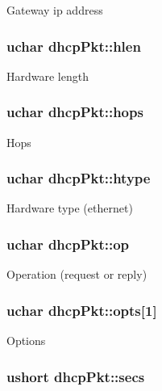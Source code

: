 Gateway ip address \hypertarget{structdhcpPkt_a08914a4ec7eb2b42b49c58846241c651}{
\subsubsection[{hlen}]{\setlength{\rightskip}{0pt plus 5cm}uchar dhcp\-Pkt\-::hlen}}\label{structdhcpPkt_a08914a4ec7eb2b42b49c58846241c651}
Hardware length \hypertarget{structdhcpPkt_ab23d57fb3a3cd50f1a98a74640be536f}{
\subsubsection[{hops}]{\setlength{\rightskip}{0pt plus 5cm}uchar dhcp\-Pkt\-::hops}}\label{structdhcpPkt_ab23d57fb3a3cd50f1a98a74640be536f}
Hops \hypertarget{structdhcpPkt_ac24a7e3d31318851bc5d84e675148d08}{
\subsubsection[{htype}]{\setlength{\rightskip}{0pt plus 5cm}uchar dhcp\-Pkt\-::htype}}\label{structdhcpPkt_ac24a7e3d31318851bc5d84e675148d08}
Hardware type (ethernet) \hypertarget{structdhcpPkt_a6240894b73b2216f6390e867274dfc9c}{
\subsubsection[{op}]{\setlength{\rightskip}{0pt plus 5cm}uchar dhcp\-Pkt\-::op}}\label{structdhcpPkt_a6240894b73b2216f6390e867274dfc9c}
Operation (request or reply) \hypertarget{structdhcpPkt_a5e3c645306d2df469b9eda0dec731bbf}{
\subsubsection[{opts}]{\setlength{\rightskip}{0pt plus 5cm}uchar dhcp\-Pkt\-::opts\mbox{[}1\mbox{]}}}\label{structdhcpPkt_a5e3c645306d2df469b9eda0dec731bbf}
Options \hypertarget{structdhcpPkt_a7475ebcc0c47265ecde655e323373912}{
\subsubsection[{secs}]{\setlength{\rightskip}{0pt plus 5cm}ushort dhcp\-Pkt\-::secs}}\label{structdhcpPkt_a7475ebcc0c47265ecde655e323373912}
